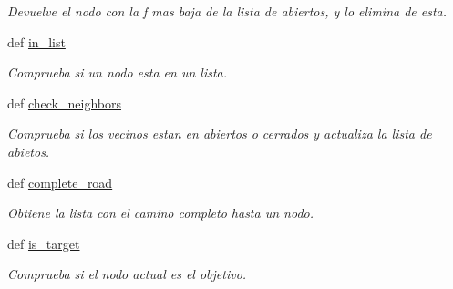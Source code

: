 \begin{DoxyCompactItemize}
\begin{DoxyCompactList}\small\item\em \-Devuelve el nodo con la f mas baja de la lista de abiertos, y lo elimina de esta. \end{DoxyCompactList}\item 
def \hyperlink{classengine_1_1astar_1_1Astar_a1216756c5673c58c3df657fe7600c703}{in\-\_\-list}
\begin{DoxyCompactList}\small\item\em \-Comprueba si un nodo esta en un lista. \end{DoxyCompactList}\item 
def \hyperlink{classengine_1_1astar_1_1Astar_af1337342f42bccf505ca3fd03e0f64d4}{check\-\_\-neighbors}
\begin{DoxyCompactList}\small\item\em \-Comprueba si los vecinos estan en abiertos o cerrados y actualiza la lista de abietos. \end{DoxyCompactList}\item 
def \hyperlink{classengine_1_1astar_1_1Astar_a893f8e3ecf7deea493bb11dc8ab5a6c6}{complete\-\_\-road}
\begin{DoxyCompactList}\small\item\em \-Obtiene la lista con el camino completo hasta un nodo. \end{DoxyCompactList}\item 
\hypertarget{classengine_1_1astar_1_1Astar_a4a25afbafbdd85cc152d8f0a34eb79b3}{
def \hyperlink{classengine_1_1astar_1_1Astar_a4a25afbafbdd85cc152d8f0a34eb79b3}{is\-\_\-target}}
\label{classengine_1_1astar_1_1Astar_a4a25afbafbdd85cc152d8f0a34eb79b3}

\begin{DoxyCompactList}\small\item\em \-Comprueba si el nodo actual es el objetivo. \end{DoxyCompactList}\end{DoxyCompactItemize}
